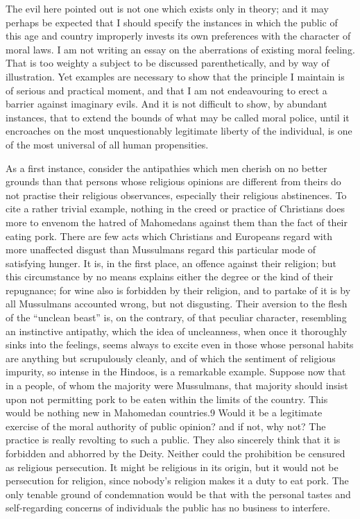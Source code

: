 \documentclass[11pt,openany]{book}
\begin{document}
The evil here pointed out is not one which exists only in theory; and it may perhaps be expected that I should specify the instances in which the public of this age and country improperly invests its own preferences with the character of moral laws. I am not writing an essay on the aberrations of existing moral feeling. That is too weighty a subject to be discussed parenthetically, and by way of illustration. Yet examples are necessary to show that the principle I maintain is of serious and practical moment, and that I am not endeavouring to erect a barrier against imaginary evils. And it is not difficult to show, by abundant instances, that to extend the bounds of what may be called moral police, until it encroaches on the most unquestionably legitimate liberty of the individual, is one of the most universal of all human propensities.

As a first instance, consider the antipathies which men cherish on no better grounds than that persons whose religious opinions are different from theirs do not practise their religious observances, especially their religious abstinences. To cite a rather trivial example, nothing in the creed or practice of Christians does more to envenom the hatred of Mahomedans against them than the fact of their eating pork. There are few acts which Christians and Europeans regard with more unaffected disgust than Mussulmans regard this particular mode of satisfying hunger. It is, in the first place, an offence against their religion; but this circumstance by no means explains either the degree or the kind of their repugnance; for wine also is forbidden by their religion, and to partake of it is by all Mussulmans accounted wrong, but not disgusting. Their aversion to the flesh of the ``unclean beast'' is, on the contrary, of that peculiar character, resembling an instinctive antipathy, which the idea of uncleanness, when once it thoroughly sinks into the feelings, seems always to excite even in those whose personal habits are anything but scrupulously cleanly, and of which the sentiment of religious impurity, so intense in the Hindoos, is a remarkable example. Suppose now that in a people, of whom the majority were Mussulmans, that majority should insist upon not permitting pork to be eaten within the limits of the country. This would be nothing new in Mahomedan countries.9 Would it be a legitimate exercise of the moral authority of public opinion? and if not, why not? The practice is really revolting to such a public. They also sincerely think that it is forbidden and abhorred by the Deity. Neither could the prohibition be censured as religious persecution. It might be religious in its origin, but it would not be persecution for religion, since nobody's religion makes it a duty to eat pork. The only tenable ground of condemnation would be that with the personal tastes and self-regarding concerns of individuals the public has no business to interfere.
\end{document}
